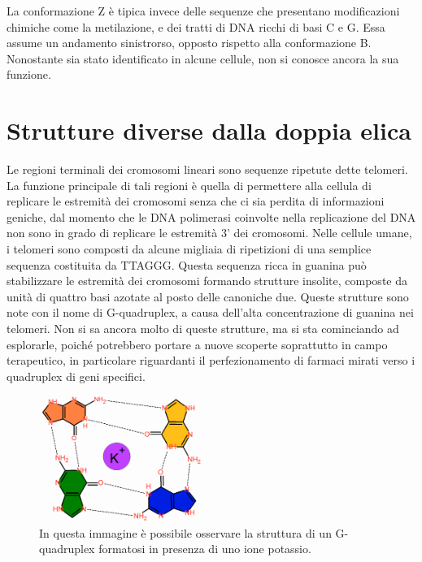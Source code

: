 \documentclass[11pt]{report}
\begin{document}
	La conformazione Z è tipica invece delle sequenze che presentano modificazioni chimiche come la metilazione, e dei tratti di DNA ricchi di basi C e G. Essa assume un andamento sinistrorso, opposto rispetto alla conformazione B. Nonostante sia stato identificato in alcune cellule, non si conosce ancora la sua funzione.
	
	\section{Strutture diverse dalla doppia elica}
	
	Le regioni terminali dei cromosomi lineari sono sequenze ripetute dette telomeri. La funzione principale di tali regioni è quella di permettere alla cellula di replicare le estremità dei cromosomi senza che ci sia perdita di informazioni geniche, dal momento che le DNA polimerasi coinvolte nella replicazione del DNA non sono in grado di replicare le estremità 3' dei cromosomi. Nelle cellule umane, i telomeri sono composti da alcune migliaia di ripetizioni di una semplice sequenza costituita da TTAGGG.\cite{wright1997normal}
	Questa sequenza ricca in guanina può stabilizzare le estremità dei cromosomi formando strutture insolite, composte da unità di quattro basi azotate al posto delle canoniche due. Queste strutture sono note con il nome di G-quadruplex, a causa dell'alta concentrazione di guanina nei telomeri. Non si sa ancora molto di queste strutture, ma si sta cominciando ad esplorarle, poiché potrebbero portare a nuove scoperte soprattutto in campo terapeutico, in particolare riguardanti il perfezionamento di farmaci mirati verso i quadruplex di geni specifici.\cite{burge2006quadruplex}
	
	\begin{figure}[h]
		\centering
		\includegraphics[width=0.47\textwidth]{quadruplex.png}	
		\caption{{\small In questa immagine è possibile osservare la struttura di un G-quadruplex formatosi in presenza di uno ione potassio.}}
	\end{figure}
\end{document}
